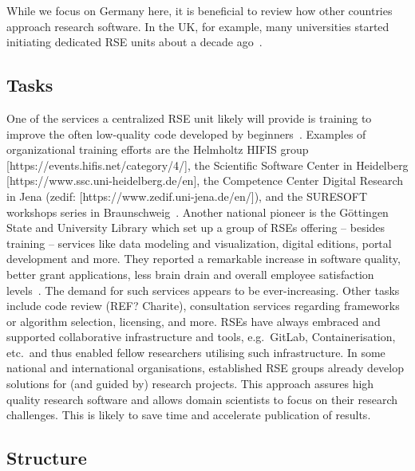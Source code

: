 \documentclass[a4paper]{article}
\begin{document}
While we focus on Germany here, it is beneficial to review how other countries approach research software.
In the UK, for example, many universities started initiating dedicated RSE units about a decade ago~\autocite{Crouch2013}.

\subsection{Tasks}

One of the services a centralized RSE unit likely will provide is training to improve the often low-quality code developed by beginners~\autocite{Ostlund2023}.
Examples of organizational training efforts are the Helmholtz HIFIS group [https://events.hifis.net/category/4/], the Scientific Software Center in Heidelberg [https://www.ssc.uni-heidelberg.de/en], the Competence Center Digital Research in Jena (zedif: [https://www.zedif.uni-jena.de/en/]), and the SURESOFT workshops series in Braunschweig~\autocite{SURESOFTLink, Blech2022}.
Another national pioneer is the Göttingen State and University Library which set up a group of RSEs offering – besides training – services like data modeling and visualization, digital editions, portal development and more.
They reported a remarkable increase in software quality, better grant applications, less brain drain and overall employee satisfaction levels~\autocite{schimavoigt2023}.
The demand for such services appears to be ever-increasing.
Other tasks include code review (REF? Charite), consultation services regarding frameworks or algorithm selection, licensing, and more.
RSEs have always embraced and supported collaborative infrastructure and tools, e.g.\ GitLab, Containerisation, etc.\ and thus enabled fellow researchers utilising such infrastructure.
In some national and international organisations, established RSE groups already develop solutions for (and guided by) research projects.
This approach assures high quality research software and allows domain scientists to focus on their research challenges.
This is likely to save time and accelerate publication of results.



\subsection{Structure}
\end{document}
